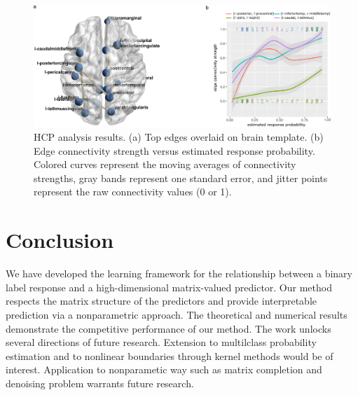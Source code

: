 \documentclass[11pt]{article}
\theoremstyle{plain}
\theoremstyle{definition}
\begin{document}
\begin{figure}[ht]
    \centering
       \includegraphics[width=1\textwidth]{brain.pdf}
 \caption{HCP analysis results. (a) Top edges overlaid on brain template. (b) Edge connectivity strength versus estimated response probability. Colored curves represent the moving averages of connectivity strengths, gray bands represent one standard error, and jitter points represent the raw connectivity values (0 or 1). }\label{fig:real2}
\end{figure}



\section{Conclusion}
We have developed the learning framework for the relationship between a binary label response and a high-dimensional matrix-valued predictor. 
Our method respects the matrix structure of the predictors and provide interpretable prediction via a nonparametric approach. 
The theoretical and numerical results demonstrate the competitive performance of our method.
The work unlocks several directions of future research. Extension to multilclass probability estimation and to nonlinear boundaries through kernel methods would be of interest. Application to nonparametic way such as matrix completion and denoising problem warrants future research.





\end{document}
